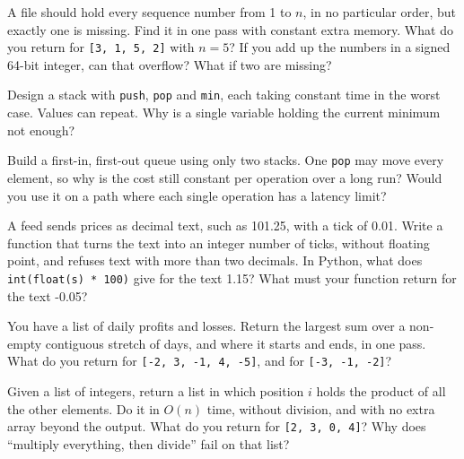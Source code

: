 \begin{question}\label{iq:iv3:algorithms:10}
A file should hold every sequence number from 1 to $n$, in no particular order, but exactly one is missing. Find it in one pass with constant extra memory. What do you return for \texttt{[3, 1, 5, 2]} with $n = 5$? If you add up the numbers in a signed 64-bit integer, can that overflow? What if two are missing?
\end{question}

\begin{question}\label{iq:iv3:algorithms:11}
Design a stack with \texttt{push}, \texttt{pop} and \texttt{min}, each taking constant time in the worst case. Values can repeat. Why is a single variable holding the current minimum not enough?
\end{question}

\begin{question}\label{iq:iv3:algorithms:12}
Build a first-in, first-out queue using only two stacks. One \texttt{pop} may move every element, so why is the cost still constant per operation over a long run? Would you use it on a path where each single operation has a latency limit?
\end{question}

\begin{question}\label{iq:iv3:algorithms:13}
A feed sends prices as decimal text, such as 101.25, with a tick of 0.01. Write a function that turns the text into an integer number of ticks, without floating point, and refuses text with more than two decimals. In Python, what does \texttt{int(float(s) * 100)} give for the text 1.15? What must your function return for the text -0.05?
\end{question}

\begin{question}\label{iq:iv3:algorithms:14}
You have a list of daily profits and losses. Return the largest sum over a non-empty contiguous stretch of days, and where it starts and ends, in one pass. What do you return for \texttt{[-2, 3, -1, 4, -5]}, and for \texttt{[-3, -1, -2]}?
\end{question}

\begin{question}\label{iq:iv3:algorithms:15}
Given a list of integers, return a list in which position $i$ holds the product of all the other elements. Do it in $O(n)$ time, without division, and with no extra array beyond the output. What do you return for \texttt{[2, 3, 0, 4]}? Why does ``multiply everything, then divide'' fail on that list?
\end{question}

